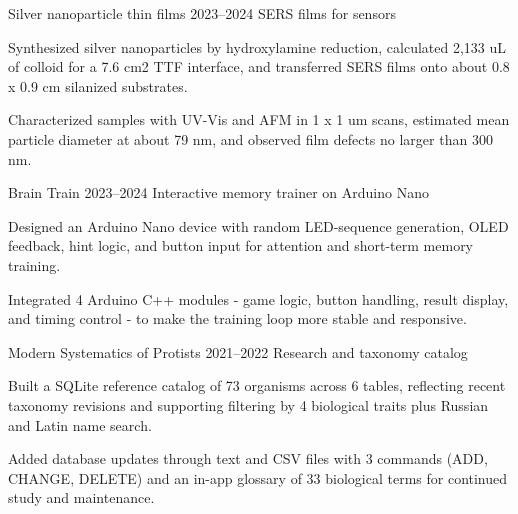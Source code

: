 \documentclass[10pt,a4paper]{article}
\begin{document}
{\begin{minipage}[t][\pagecontentheight]{\mainwidth}
\begin{minipage}[t][\maininnerheight]{\maininnerwidth}
    \MainEntry
      {Silver nanoparticle thin films}
      {2023--2024}
      {SERS films for sensors}
      {}
      {\begin{mainbullets}
        \item Synthesized silver nanoparticles by hydroxylamine reduction, calculated 2,133 uL of colloid for a 7.6 cm2 TTF interface, and transferred SERS films onto about 0.8 x 0.9 cm silanized substrates.
        \item Characterized samples with UV-Vis and AFM in 1 x 1 um scans, estimated mean particle diameter at about 79 nm, and observed film defects no larger than 300 nm.
      \end{mainbullets}}

    \MainEntry
      {Brain Train}
      {2023--2024}
      {Interactive memory trainer on Arduino Nano}
      {}
      {\begin{mainbullets}
        \item Designed an Arduino Nano device with random LED-sequence generation, OLED feedback, hint logic, and button input for attention and short-term memory training.
        \item Integrated 4 Arduino C++ modules - game logic, button handling, result display, and timing control - to make the training loop more stable and responsive.
      \end{mainbullets}}

    \MainEntry
      {Modern Systematics of Protists}
      {2021--2022}
      {Research and taxonomy catalog}
      {}
      {\begin{mainbullets}
        \item Built a SQLite reference catalog of 73 organisms across 6 tables, reflecting recent taxonomy revisions and supporting filtering by 4 biological traits plus Russian and Latin name search.
        \item Added database updates through text and CSV files with 3 commands (ADD, CHANGE, DELETE) and an in-app glossary of 33 biological terms for continued study and maintenance.
      \end{mainbullets}}

    \RightFooter{}
  \end{minipage}
\end{minipage}}
\end{document}
